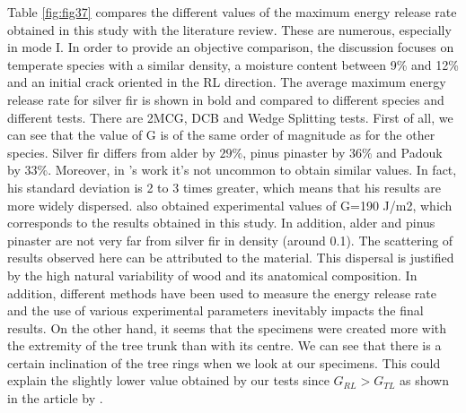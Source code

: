 Table \ref{fig:fig37} compares the different values of the maximum energy release rate obtained in this study with the literature review. These are numerous, especially in mode I. In order to provide an objective comparison, the discussion focuses on temperate species with a similar density, a moisture content between 9\% and 12\% and an initial crack oriented in the RL direction. The average maximum energy release rate for silver fir is shown in bold and compared to different species and different tests. There are 2MCG, DCB and Wedge Splitting tests.
First of all, we can see that the value of G is of the same order of magnitude as for the other species. Silver fir differs from alder by $29 \%$, pinus pinaster by $36 \%$ and Padouk by $33 \%$. Moreover, in \cite{Odounga2018phd}'s work it's not uncommon to obtain similar values. In fact, his standard deviation is 2 to 3 times greater, which means that his results are more widely dispersed.
\cite{Xavieretal2014} also obtained experimental values of G=190 J/m2, which corresponds to the results obtained in this study. In addition, alder and pinus pinaster are not very far from silver fir in density (around 0.1).
The scattering of results observed here can be attributed to the material. This dispersal is justified by the high natural variability of wood and its anatomical composition.
In addition, different methods have been used to measure the energy release rate and the use of various experimental parameters inevitably impacts the final results.
On the other hand, it seems that the specimens were created more with the extremity of the tree trunk than with its centre. We can see that there is a certain inclination of the tree rings when we look at our specimens. This could explain the slightly lower value obtained by our tests since $G_{RL}> G_{TL}$ as shown in the article by \cite{Reiterer2002}.

